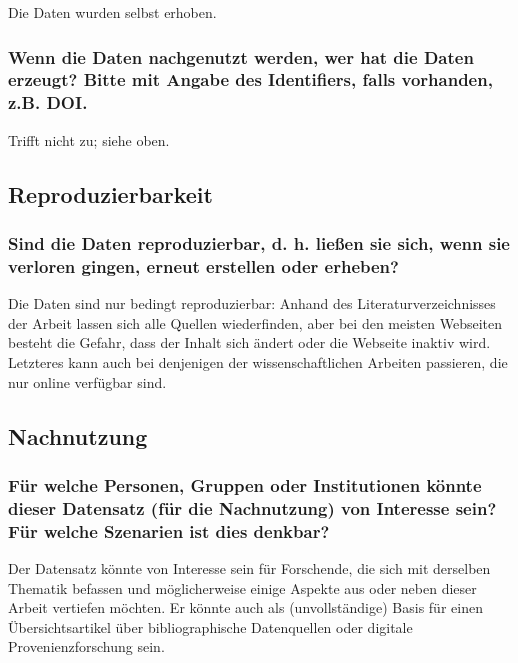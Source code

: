Die Daten wurden selbst erhoben.

\subsubsection{Wenn die Daten nachgenutzt werden, wer hat die Daten erzeugt? Bitte mit Angabe des Identifiers, falls vorhanden, z.B. DOI.}

Trifft nicht zu; siehe oben.

\subsection{Reproduzierbarkeit}

\subsubsection{Sind die Daten reproduzierbar, d. h. ließen sie sich, wenn sie verloren gingen, erneut erstellen oder erheben?}

Die Daten sind nur bedingt reproduzierbar:
Anhand des Literaturverzeichnisses der Arbeit lassen sich alle Quellen wiederfinden,
aber bei den meisten Webseiten besteht die Gefahr, dass der Inhalt sich ändert oder
die Webseite inaktiv wird. Letzteres kann auch bei denjenigen der wissenschaftlichen
Arbeiten passieren, die nur online verfügbar sind.

\subsection{Nachnutzung}

\subsubsection{Für welche Personen, Gruppen oder Institutionen könnte dieser Datensatz (für die Nachnutzung) von Interesse sein? Für welche Szenarien ist dies denkbar?}

Der Datensatz könnte von Interesse sein für Forschende, die sich mit derselben Thematik befassen
und möglicherweise einige Aspekte aus oder neben dieser Arbeit vertiefen möchten.
Er könnte auch als (unvollständige) Basis für einen Übersichtsartikel über bibliographische Datenquellen
oder digitale Provenienzforschung sein.

